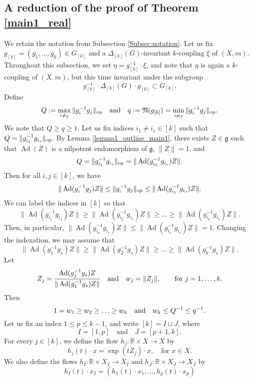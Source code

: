 \documentclass[11pt,reqno,a4paper]{amsart}
\numberwithin{equation}{section}
\newcommand{\bR}{\mathbb{R}}
\newcommand{\gog}{\mathfrak{g}}
\newcommand{\ra}{\rightarrow}
\newcommand{\qand}{\quad \textrm{and} \quad}
\DeclareMathOperator{\Ad}{Ad}
\theoremstyle{theorem}
\theoremstyle{definition}
\begin{document}
\subsection{A reduction of the proof of Theorem \ref{main1_real}} \label{sec:p2}
We retain the notation from Subsection \ref{Subsec:notation}. Let us fix $g_{[k]} = (g_1,\ldots,g_k) \in G_{[k]}$ and 
a $\Delta_{[k]}(G)$-invariant $k$-coupling $\xi$ of $(X,m)$. Throughout this subsection, we set $\eta = g_{[k]}^{-1} \cdot \xi$, and note that $\eta$ is again a $k$-coupling of $(X,m)$, but this time invariant under the subgroup 
\[
 g_{[k]}^{-1} \cdot \Delta_{[k]}(G) \cdot g_{[k]} \subset G_{[k]}.
\]
Define 
$$
Q := \max_{i \neq j} \|g_{i}^{-1} g_j\|_{\rm op}\quad \hbox{and}\quad q: = \mathfrak{N}(g_{[k]})=\min_{i \neq j} \|g_{i}^{-1} g_j\|_{\rm op}.
$$
We note that $Q\ge q\ge 1$.
Let us fix indices $i_1\ne i_s \in [k]$ such that $Q = \|g_{i_1}^{-1} g_{i_s}\|_{\rm op}$.
By Lemma \ref{lemma1_outline_main1}, 
there exists $Z \in \gog$ such that 
$\Ad(Z)$
is a nilpotent endomorphism of $\mathfrak{g}$, $\|Z\| = 1$, and
\[
Q = \|g_{i_1}^{-1} g_{i_s}\|_{\rm op} = \|\Ad(g_{i_1}^{-1} g_{i_s})Z\|.
\]
Then for all $i,j\in [k]$, we have 
$$
\|\Ad(g_i^{-1}g_j)Z\|\le \|g_i^{-1}g_j\|_{\rm op}\le \|\Ad(g_{i_1}^{-1} g_{i_s})Z\|.
$$
We can label the indices in $[k]$ so that
\[
\|\Ad(g_{i_1}^{-1}g_{i_s})Z\| \geq \|\Ad(g_{i_2}^{-1}g_{i_s})Z\| \geq \ldots \geq \|\Ad(g_{i_k}^{-1}g_{i_s})Z\|.
\]
Then, in particular, $\|\Ad(g_{i_k}^{-1}g_{i_s})Z\|\le \|\Ad(g_{i_s}^{-1}g_{i_s})Z\|=1$.
Changing the indexation, we may assume that 
\[
\|\Ad(g_{1}^{-1}g_{s})Z\| \geq \|\Ad(g_{2}^{-1}g_{s})Z\| \geq \ldots \geq \|\Ad(g_{k}^{-1}g_{s})Z\|.
\]
Let 
\[
Z_j = \frac{\Ad(g_{j}^{-1} g_{s})Z}{\|\Ad(g_{1}^{-1} g_{s})Z\|}\quad \hbox{and}
\quad w_j = \|Z_j\|, \quad\quad \textrm{for $j = 1,\ldots,k$}.
\]
Then
\begin{equation}
\label{normalization}
1 = w_1 \geq w_2 \geq \ldots \geq w_k\quad \hbox{and} \quad w_k \le Q^{-1}\le q^{-1}.
\end{equation}
Let us fix an index $1 \leq p \le k-1$, and write $[k] = I \sqcup J$, where
\[
I = [1,p] \qand J = [p+1,k].
\]
For every $j \in [k]$, we define the flow $h_j : \bR \times X \ra X$ by
\begin{equation}
\label{defhj}
h_j(t) \cdot x = \exp(tZ_j) \cdot x, \quad \textrm{for $x \in X$}.
\end{equation}
We also define the flows $h_I : \bR \times X_I \ra X_I$ and $h_J : \bR \times X_J \ra X_J$ by
\begin{equation}
\label{eq:hI}
h_I(t) \cdot x_I = (h_1(t) \cdot x_1,\ldots,h_p(t) \cdot x_p)
\end{equation}
\end{document}
